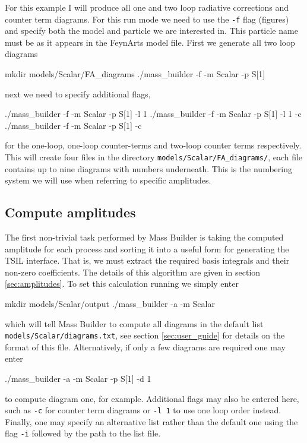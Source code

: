 For this example I will produce all one and two loop radiative corrections and counter term diagrams.  For this run mode we need to use the \lstinline{-f} flag (figures) and specify both the model and particle we are interested in.  This particle name must be as it appears in the FeynArts model file.  First we generate all two loop diagrams
\begin{lstterm}
mkdir models/Scalar/FA_diagrams
./mass_builder -f -m Scalar -p S[1]
\end{lstterm}
next we need to specify additional flags,
\begin{lstterm}
./mass_builder -f -m Scalar -p S[1] -l 1
./mass_builder -f -m Scalar -p S[1] -l 1 -c
./mass_builder -f -m Scalar -p S[1] -c
\end{lstterm}
for the one-loop, one-loop counter-terms and two-loop counter terms respectively.  This will create four files in the directory \lstinline{models/Scalar/FA_diagrams/}, each file contains up to nine diagrams with numbers underneath.  This is the numbering system we will use when referring to specific amplitudes.

\subsection{Compute amplitudes}

The first non-trivial task performed by Mass Builder is taking the computed amplitude for each process and sorting it into a useful form for generating the TSIL interface.  That is, we must extract the required basis integrals and their non-zero coefficients.  The details of this algorithm are given in section \ref{sec:amplitudes}.  To set this calculation running we simply enter
\begin{lstterm}
mkdir models/Scalar/output
./mass_builder -a -m Scalar
\end{lstterm}
which will tell Mass Builder to compute all diagrams in the default list \lstinline{models/Scalar/diagrams.txt}, see section \ref{sec:user_guide} for details on the format of this file.  Alternatively, if only a few diagrams are required one may enter
\begin{lstterm}
./mass_builder -a -m Scalar -p S[1] -d 1
\end{lstterm}
to compute diagram one, for example.  Additional flags may also be entered here, such as \lstinline{-c} for counter term diagrams or \lstinline{-l 1} to use one loop order instead.  Finally, one may specify an alternative list rather than the default one using the flag \lstinline{-i} followed by the path to the list file.


